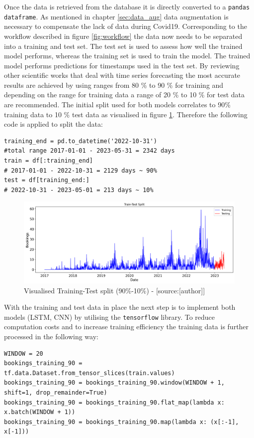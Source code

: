Once the data is retrieved from the database it is directly converted to a \verb|pandas dataframe|. As mentioned in chapter \ref{sec:data_aug} data augmentation is necessary to compensate the lack of data during Covid19. Corresponding to the workflow described in figure \ref{fig:workflow} the data now needs to be separated into a training and test set. The test set is used to assess how well the trained model performs, whereas the training set is used to train the model. The trained model performs predictions for timestamps used in the test set. By reviewing other scientific works that deal with time series forecasting \cite{1d_cnn}\cite{cnn_vechicle}\cite{cnn_intro}\cite{lstm_overcome_rnn_problem}\cite{lstm_module}\cite{lstm_stock} the most accurate results are achieved by using ranges from 80 \% to 90 \% for training and depending on the range for training data a range of 20 \% to 10 \% for test data are recommended. The initial split used for both models correlates to 90\% training data to 10 \% test data as visualised in figure \ref{fig:training_test}. Therefore the following code is applied to split the data:
\begin{lstlisting}
training_end = pd.to_datetime('2022-10-31')
#total range 2017-01-01 - 2023-05-31 = 2342 days
train = df[:training_end]
# 2017-01-01 - 2022-10-31 = 2129 days ~ 90%
test = df[training_end:]
# 2022-10-31 - 2023-05-01 = 213 days ~ 10%
\end{lstlisting}
\begin{figure}[H]
	\centering
		\includegraphics[width=14cm]{images/1st_model_training_split}
	\caption{Visualised Training-Test split (90\%-10\%) - [source:[author]]}
	\label{fig:training_test}
\end{figure}
With the training and test data in place the next step is to implement both models (LSTM, CNN) by utilising the \verb|tensorflow| library. To reduce computation costs and to increase training efficiency the training data is further processed in the following way:
\begin{lstlisting}
WINDOW = 20
bookings_training_90 = tf.data.Dataset.from_tensor_slices(train.values)
bookings_training_90 = bookings_training_90.window(WINDOW + 1, shift=1, drop_remainder=True)
bookings_training_90 = bookings_training_90.flat_map(lambda x: x.batch(WINDOW + 1))
bookings_training_90 = bookings_training_90.map(lambda x: (x[:-1], x[-1]))
\end{lstlisting}
